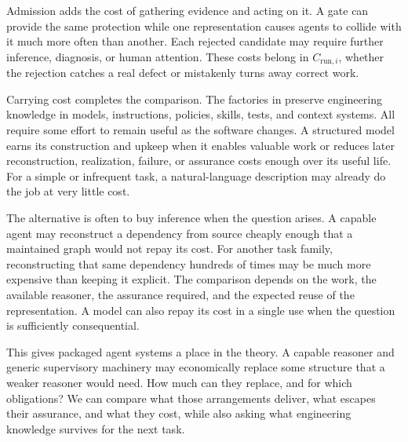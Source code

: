 
Admission adds the cost of gathering evidence and acting on it. A gate can provide the same protection while one representation causes agents to collide with it much more often than another. Each rejected candidate may require further inference, diagnosis, or human attention. These costs belong in \(C_{\text{run},i}\), whether the rejection catches a real defect or mistakenly turns away correct work.


Carrying cost completes the comparison. The factories in  preserve engineering knowledge in models, instructions, policies, skills, tests, and context systems. All require some effort to remain useful as the software changes. A structured model earns its construction and upkeep when it enables valuable work or reduces later reconstruction, realization, failure, or assurance costs enough over its useful life. For a simple or infrequent task, a natural-language description may already do the job at very little cost.

The alternative is often to buy inference when the question arises. A capable agent may reconstruct a dependency from source cheaply enough that a maintained graph would not repay its cost. For another task family, reconstructing that same dependency hundreds of times may be much more expensive than keeping it explicit. The comparison depends on the work, the available reasoner, the assurance required, and the expected reuse of the representation. A model can also repay its cost in a single use when the question is sufficiently consequential.


This gives packaged agent systems a place in the theory. A capable reasoner and generic supervisory machinery may economically replace some structure that a weaker reasoner would need. How much can they replace, and for which obligations? We can compare what those arrangements deliver, what escapes their assurance, and what they cost, while also asking what engineering knowledge survives for the next task.

